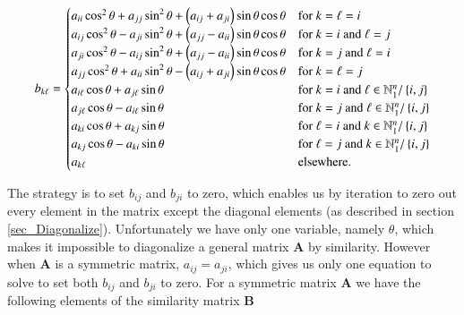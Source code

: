 \documentclass[11pt,english,a4paper]{article}
\begin{document}
\begin{flushleft}
\begin{align*}
b_{k\ell} = \begin{cases} a_{ii} \cos^2\theta  + a_{jj}\sin^2 \theta + \left({a_{ij} + a_{ji}}\right)\sin\theta\cos\theta & \text{for $k=\ell=i$} \\ a_{ij}\cos^2\theta - a_{ji}\sin^2\theta + \left({a_{jj}-a_{ii}}\right)\sin\theta\cos\theta & \text{for $k=i$ and $\ell = j$} \\ a_{ji}\cos^2\theta - a_{ij}\sin^2\theta + \left({a_{jj}-a_{ii}}\right)\sin\theta\cos\theta & \text{for $k=j$ and $\ell=i$} \\ a_{jj} \cos^2\theta  + a_{ii}\sin^2 \theta - \left({a_{ij} + a_{ji}}\right)\sin\theta\cos\theta & \text{for $k=\ell=j$} \\ a_{i \ell} \cos\theta +  a_{j\ell} \sin\theta & \text{for $k=i$ and $\ell\in\mathbb{N}_1^n / \left\lbrace{i,j}\right\rbrace$} \\ a_{j\ell} \cos\theta - a_{i\ell}\sin\theta & \text{for $k=j$ and $\ell\in\mathbb{N}_1^n / \left\lbrace{i,j}\right\rbrace$} \\ a_{ki} \cos\theta + a_{kj}\sin\theta & \text{for $\ell=i$ and $k\in\mathbb{N}_1^n / \left\lbrace{i,j}\right\rbrace$} \\ a_{kj}\cos\theta - a_{ki}\sin\theta & \text{for $\ell=j$ and $k\in\mathbb{N}_1^n / \left\lbrace{i,j}\right\rbrace$} \\ a_{k\ell} & \text{elsewhere.}\end{cases}
\end{align*}

The strategy is to set $b_{ij}$ and $b_{ji}$ to zero, which enables us by iteration to zero out every element in the matrix except the diagonal elements (as described in section \ref{sec_Diagonalize}). Unfortunately we have only one variable, namely $\theta$, which makes it impossible to diagonalize a general matrix $\mathbf{A}$ by similarity. However when $\mathbf{A}$ is a symmetric matrix, $a_{ij}=a_{ji}$, which gives us only one equation to solve to set both $b_{ij}$ and $b_{ji}$ to zero. For a symmetric matrix $\mathbf{A}$ we have the following elements of the similarity matrix $\mathbf{B}$


\end{flushleft}
\end{document}
